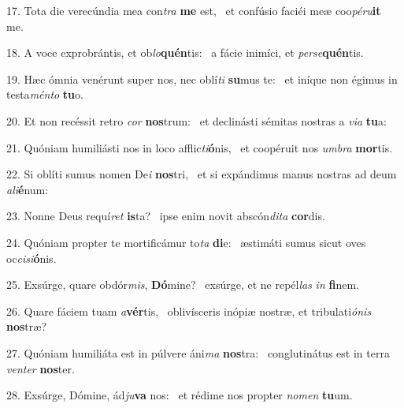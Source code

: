 17. Tota die verecúndia mea con\textit{tra} \textbf{me} est, \ast\  et confúsio faciéi meæ coo\textit{pé}\textit{ru}\textbf{it} me.\

18. A voce exprobrántis, et ob\textit{lo}\textbf{quén}tis: \ast\  a fácie inimíci, et \textit{per}\textit{se}\textbf{quén}tis.\

19. Hæc ómnia venérunt super nos, nec oblí\textit{ti} \textbf{su}mus te: \ast\  et iníque non égimus in testa\textit{mén}\textit{to} \textbf{tu}o.\

20. Et non recéssit retro \textit{cor} \textbf{nos}trum: \ast\  et declinásti sémitas nostras a \textit{vi}\textit{a} \textbf{tu}a:\

21. Quóniam humiliásti nos in loco afflic\textit{ti}\textbf{ó}nis, \ast\  et coopéruit nos \textit{um}\textit{bra} \textbf{mor}tis.\

22. Si oblíti sumus nomen De\textit{i} \textbf{nos}tri, \ast\  et si expándimus manus nostras ad deum \textit{a}\textit{li}\textbf{é}num:\

23. Nonne Deus requí\textit{ret} \textbf{is}ta? \ast\  ipse enim novit abscón\textit{di}\textit{ta} \textbf{cor}dis.\

24. Quóniam propter te mortificámur to\textit{ta} \textbf{di}e: \ast\  æstimáti sumus sicut oves oc\textit{ci}\textit{si}\textbf{ó}nis.\

25. Exsúrge, quare obdór\textit{mis}, \textbf{Dó}mine? \ast\  exsúrge, et ne repél\textit{las} \textit{in} \textbf{fi}nem.\

26. Quare fáciem tuam \textit{a}\textbf{vér}tis, \ast\  oblivísceris inópiæ nostræ, et tribulati\textit{ó}\textit{nis} \textbf{nos}træ?\

27. Quóniam humiliáta est in púlvere áni\textit{ma} \textbf{nos}tra: \ast\  conglutinátus est in terra \textit{ven}\textit{ter} \textbf{nos}ter.\

28. Exsúrge, Dómine, ád\textit{ju}\textbf{va} nos: \ast\  et rédime nos propter \textit{no}\textit{men} \textbf{tu}um.\

